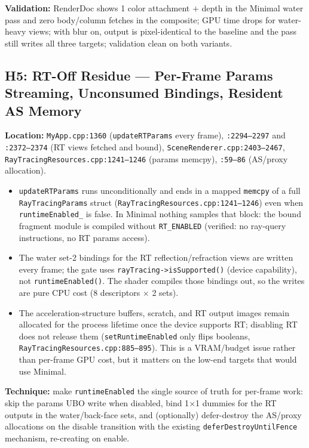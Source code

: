 \documentclass[11pt,a4paper]{article}
\begin{document}
\begin{tcolorbox}[promptbox={Prompt: Skip Body/Column Attachments and Composite Samples When Blur Is Off}]
\textbf{Validation:} RenderDoc shows 1 color attachment $+$ depth in the Minimal water pass and zero body/column fetches in the composite; GPU time drops for water-heavy
views; with blur on, output is pixel-identical to the baseline and the pass still writes all three targets; validation clean on both variants.
\end{tcolorbox}

\subsection{H5: RT-Off Residue --- Per-Frame Params Streaming, Unconsumed Bindings, Resident AS Memory}

\textbf{Location:} \texttt{MyApp.cpp:1360} (\texttt{updateRTParams} every frame), \texttt{:2294--2297} and \texttt{:2372--2374} (RT views fetched and bound),
\texttt{SceneRenderer.cpp:2403--2467}, \texttt{RayTracingResources.cpp:1241--1246} (params memcpy), \texttt{:59--86} (AS/proxy allocation).

\begin{itemize}
    \item \texttt{updateRTParams} runs unconditionally and ends in a mapped \texttt{memcpy} of a full \texttt{RayTracingParams} struct
    (\texttt{RayTracingResources.cpp:1241--1246}) even when \texttt{runtimeEnabled\_} is false. In Minimal nothing samples that block: the bound fragment module is compiled
    without \texttt{RT\_ENABLED} (verified: no ray-query instructions, no RT params access).
    \item The water set-2 bindings for the RT reflection/refraction views are written every frame; the gate uses \texttt{rayTracing->isSupported()} (device capability), not
    \texttt{runtimeEnabled()}. The shader compiles those bindings out, so the writes are pure CPU cost (8 descriptors $\times$ 2 sets).
    \item The acceleration-structure buffers, scratch, and RT output images remain allocated for the process lifetime once the device supports RT; disabling RT does not
    release them (\texttt{setRuntimeEnabled} only flips booleans, \texttt{RayTracingResources.cpp:885--895}). This is a VRAM/budget issue rather than per-frame GPU cost, but it
    matters on the low-end targets that would use Minimal.
\end{itemize}

\textbf{Technique:} make \texttt{runtimeEnabled} the single source of truth for per-frame work: skip the params UBO write when disabled, bind 1$\times$1 dummies for the RT
outputs in the water/back-face sets, and (optionally) defer-destroy the AS/proxy allocations on the disable transition with the existing \texttt{deferDestroyUntilFence}
mechanism, re-creating on enable.
\end{document}

